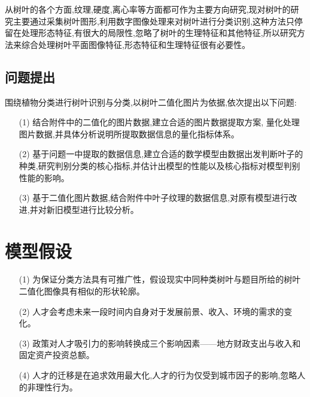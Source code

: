 \documentclass{whutmod}
\begin{document}
    从树叶的各个方面,纹理,硬度,离心率等方面都可作为主要方向研究,现对树叶的研究主要通过采集树叶图形,利用数字图像处理来对树叶进行分类识别,这种方法只停留在处理形态特征,有很大的局限性,忽略了树叶的生理特征和其他特征,所以研究方法来综合处理树叶平面图像特征,形态特征和生理特征很有必要性。
    
    

	\subsection{问题提出}
    围绕植物分类进行树叶识别与分类,以树叶二值化图片为依据,依次提出以下问题:
		 
	\begin{itemize}
	\item [(1)] 结合附件中的二值化的图片数据,建立合适的图片数据提取方案, 量化处理图片数据,并具体分析说明所提取数据信息的量化指标体系。
	\item [(2)] 基于问题一中提取的数据信息,建立合适的数学模型由数据出发判断叶子的种类,研究判别分类的核心指标,并估计出模型的性能以及核心指标对模型判别性能的影响。
	\item [(3)] 基于二值化图片数据,结合附件中叶子纹理的数据信息,对原有模型进行改进,并对新旧模型进行比较分析。
	\end{itemize}
	
	\section{模型假设}
	\begin{itemize}
		\item [(1)] 为保证分类方法具有可推广性，假设现实中同种类树叶与题目所给的树叶二值化图像具有相似的形状轮廓。
		\item [(2)] 人才会考虑未来一段时间内自身对于发展前景、收入、环境的需求的变化。
		\item [(3)] 政策对人才吸引力的影响转换成三个影响因素——地方财政支出与收入和固定资产投资总额。
		\item [(4)] 人才的迁移是在追求效用最大化,人才的行为仅受到城市因子的影响,忽略人的非理性行为。
	\end{itemize}
	
	
\end{document}
